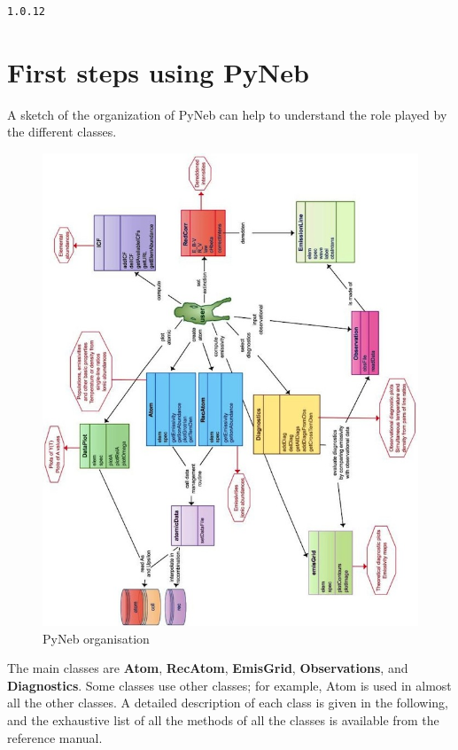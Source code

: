 \documentclass{report}
\begin{document}
    \begin{Verbatim}[commandchars=\\\{\}]
1.0.12
    \end{Verbatim}


    \section{First steps using PyNeb}


    A sketch of the organization of PyNeb can help to understand the role
played by the different classes.

    \begin{figure}[htbp]
\centering
\includegraphics{PN_organisation.jpg}
\caption{PyNeb organisation}
\end{figure}

    The main classes are \textbf{Atom}, \textbf{RecAtom}, \textbf{EmisGrid},
\textbf{Observations}, and \textbf{Diagnostics}. Some classes use other
classes; for example, Atom is used in almost all the other classes. A
detailed description of each class is given in the following, and the
exhaustive list of all the methods of all the classes is available from
the reference manual.
\end{document}
